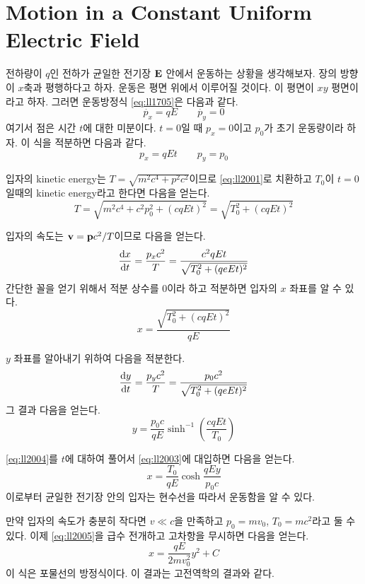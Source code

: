 \section{Motion in a Constant Uniform Electric Field}
\label{sec:05a-06a}

전하량이 $q$인 전하가 균일한 전기장 $\vb{E}$ 안에서 운동하는 상황을 생각해보자. 장의 방향이 $x$축과 평행하다고 하자. 운동은 평면 위에서 이루어질 것이다. 이 평면이 $xy$ 평면이라고 하자.
그러면 운동방정식 \eqref{eq:ll1705}은 다음과 같다.
\begin{equation*}
    \dot{p_x} = q E \qquad \dot{p_y} = 0
\end{equation*}
여기서 점은 시간 $t$에 대한 미분이다.
$t = 0$일 때 $p_x = 0$이고 $p_0$가 초기 운동량이라 하자. 이 식을 적분하면 다음과 같다.
\begin{equation}\label{eq:ll2001}
    p_x = q E t \qquad p_y = p_0
\end{equation}

입자의 kinetic energy는 $T = \sqrt{m^2 c^4 + p^2 c^2}$이므로 \eqref{eq:ll2001}로 치환하고 $T_0$이 $t = 0$일때의 kinetic energy라고 한다면 다음을 얻는다.
\begin{equation}\label{eq:ll2002}
    T = \sqrt{m^2 c^4 + c^2 p_0^2 + (c q E t)^2} = \sqrt{T_0^2 + (c q E t)^2}
\end{equation}

입자의 속도는 $\vb{v} = \vb{p} c^2 / T$이므로 다음을 얻는다.
\begin{equation*}
    \dv{x}{t} = \frac{p_x c^2}{T} = \frac{c^2 q E t}{\sqrt{T_0^2 + (q e E t)^2}}
\end{equation*}
간단한 꼴을 얻기 위해서 적분 상수를 $0$이라 하고 적분하면 입자의 $x$ 좌표를 알 수 있다.
\begin{equation}\label{eq:ll2003}
    x = \frac{\sqrt{T_0^2 + (c q E t)^2}}{q E}
\end{equation}

$y$ 좌표를 알아내기 위하여 다음을 적분한다.
\begin{equation*}
    \dv{y}{t} = \frac{p_y c^2}{T} = \frac{p_0 c^2}{\sqrt{T_0^2 + (q e E t)^2}}
\end{equation*}
그 결과 다음을 얻는다.
\begin{equation}\label{eq:ll2004}
    y = \frac{p_0 c}{q E} \sinh^{-1} \left( \frac{c q E t}{T_0} \right)
\end{equation}

\eqref{eq:ll2004}를 $t$에 대하여 풀어서 \eqref{eq:ll2003}에 대입하면 다음을 얻는다.
\begin{equation}\label{eq:ll2005}
    x = \frac{T_0}{q E} \cosh \frac{q E y}{p_0 c}
\end{equation}
이로부터 균일한 전기장 안의 입자는 현수선을 따라서 운동함을 알 수 있다.

만약 입자의 속도가 충분히 작다면 $v \ll c$을 만족하고 $ p_0 = m v_0 $, $ T_0 = m c^2$라고 둘 수 있다. 이제 \eqref{eq:ll2005}을 급수 전개하고 고차항을 무시하면 다음을 얻는다.
\begin{equation*}
    x = \frac{q E}{2 m v_0^2} y^2 + C
\end{equation*}
이 식은 포물선의 방정식이다. 이 결과는 고전역학의 결과와 같다.